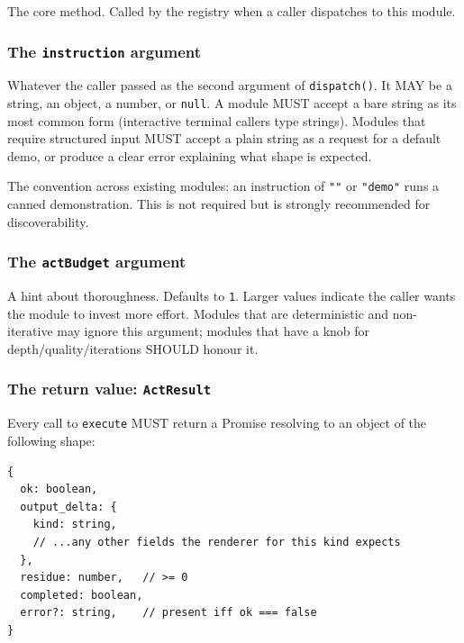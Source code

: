 \documentclass[11pt,a4paper]{article}
\theoremstyle{contract}
\begin{document}
The core method. Called by the registry when a caller dispatches to
this module.

\subsubsection*{The \texttt{instruction} argument}

Whatever the caller passed as the second argument of
\texttt{dispatch()}. It MAY be a string, an object, a number, or
\texttt{null}. A module MUST accept a bare string as its most common
form (interactive terminal callers type strings). Modules that require
structured input MUST accept a plain string as a request for a default
demo, or produce a clear error explaining what shape is expected.

The convention across existing modules: an instruction of \texttt{""}
or \texttt{"demo"} runs a canned demonstration. This is not required
but is strongly recommended for discoverability.

\subsubsection*{The \texttt{actBudget} argument}

A hint about thoroughness. Defaults to \texttt{1}. Larger values indicate
the caller wants the module to invest more effort. Modules that are
deterministic and non-iterative may ignore this argument; modules that
have a knob for depth/quality/iterations SHOULD honour it.

\subsubsection*{The return value: \texttt{ActResult}}

Every call to \texttt{execute} MUST return a Promise resolving to an
object of the following shape:

\begin{lstlisting}
{
  ok: boolean,
  output_delta: {
    kind: string,
    // ...any other fields the renderer for this kind expects
  },
  residue: number,   // >= 0
  completed: boolean,
  error?: string,    // present iff ok === false
}
\end{lstlisting}
\end{document}
